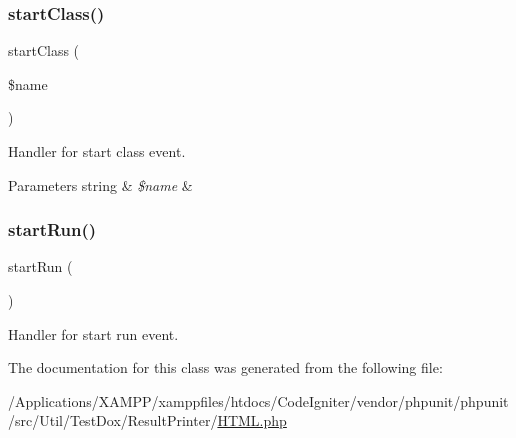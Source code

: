 \subsubsection{\texorpdfstring{start\+Class()}{startClass()}}
{\footnotesize\ttfamily start\+Class (\begin{DoxyParamCaption}\item[{}]{\$name }\end{DoxyParamCaption})\hspace{0.3cm}{\ttfamily [protected]}}

Handler for \textquotesingle{}start class\textquotesingle{} event.


\begin{DoxyParams}[1]{Parameters}
string & {\em \$name} & \\
\hline
\end{DoxyParams}
\mbox{\label{class_p_h_p_unit___util___test_dox___result_printer___h_t_m_l_abed24f32f95c38cdce0c4b84db2f6888}} 
\subsubsection{\texorpdfstring{start\+Run()}{startRun()}}
{\footnotesize\ttfamily start\+Run (\begin{DoxyParamCaption}{ }\end{DoxyParamCaption})\hspace{0.3cm}{\ttfamily [protected]}}

Handler for \textquotesingle{}start run\textquotesingle{} event. 

The documentation for this class was generated from the following file\+:\begin{DoxyCompactItemize}
\item 
/\+Applications/\+X\+A\+M\+P\+P/xamppfiles/htdocs/\+Code\+Igniter/vendor/phpunit/phpunit/src/\+Util/\+Test\+Dox/\+Result\+Printer/\mbox{\hyperlink{_h_t_m_l_8php}{H\+T\+M\+L.\+php}}\end{DoxyCompactItemize}
